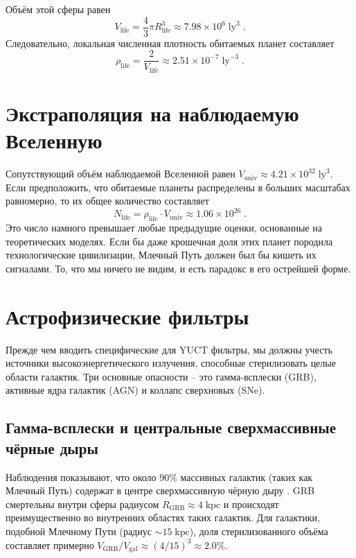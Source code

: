 \documentclass[11pt,a4paper]{article}
\begin{document}
	Объём этой сферы равен
	\begin{equation}
		V_{\mathrm{life}} = \frac{4}{3}\pi R_{\mathrm{life}}^{3}
		\approx 7.98\times 10^{6}\;\mathrm{ly}^{3}\; .
	\end{equation}
	Следовательно, локальная численная плотность обитаемых планет составляет
	\begin{equation}
		\rho_{\mathrm{life}} = \frac{2}{V_{\mathrm{life}}}
		\approx 2.51\times 10^{-7}\;\mathrm{ly}^{-3}\; .
	\end{equation}
	
	\section{Экстраполяция на наблюдаемую Вселенную}
	\label{sec:extrapolation}
	Сопутствующий объём наблюдаемой Вселенной равен
	\(V_{\mathrm{univ}} \approx 4.21\times 10^{32}\;\mathrm{ly}^{3}\).
	Если предположить, что обитаемые планеты распределены в больших масштабах равномерно, то их общее количество составляет
	\begin{equation}
		\label{eq:N_life_total}
		N_{\mathrm{life}} = \rho_{\mathrm{life}} \cdot V_{\mathrm{univ}}
		\approx 1.06\times 10^{26}\; .
	\end{equation}
	Это число намного превышает любые предыдущие оценки, основанные на теоретических моделях. Если бы даже крошечная доля этих планет породила технологические цивилизации, Млечный Путь должен был бы кишеть их сигналами. То, что мы ничего не видим, и есть парадокс в его острейшей форме.
	
	\section{Астрофизические фильтры}
	\label{sec:astro_filters}
	Прежде чем вводить специфические для YUCT фильтры, мы должны учесть источники высокоэнергетического излучения, способные стерилизовать целые области галактик. Три основные опасности – это гамма-всплески (GRB), активные ядра галактик (AGN) и коллапс сверхновых (SNe).
	
	\subsection{Гамма-всплески и центральные сверхмассивные чёрные дыры}
	\label{sec:grb}
	Наблюдения показывают, что около \(90\%\) массивных галактик (таких как Млечный Путь) содержат в центре сверхмассивную чёрную дыру \citep{Chandra2025}. GRB смертельны внутри сферы радиусом \(R_{\mathrm{GRB}} \approx 4\;\mathrm{kpc}\) и происходят преимущественно во внутренних областях таких галактик. Для галактики, подобной Млечному Пути (радиус \(\sim 15\;\mathrm{kpc}\)), доля стерилизованного объёма составляет примерно \(V_{\mathrm{GRB}}/V_{\mathrm{gal}} \approx (4/15)^{3} \approx 2.0\%\).
	
\end{document}
